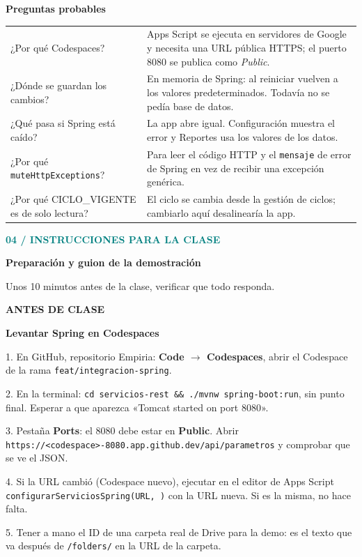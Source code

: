 \documentclass[11pt,a4paper]{article}
\newcommand{\titulo}[3]{\textcolor{teal}{\small\textbf{#1}}\par{\LARGE\bfseries #2}\par\vspace{2mm}#3\par\vspace{3mm}}
\newcommand{\paso}[4]{\begin{tcolorbox}[colback=#1!5!white,colframe=#1!40!white,boxrule=0.5pt,arc=2mm,left=3mm,right=3mm,top=2mm,bottom=2mm,before upper=\raggedright]\textcolor{#1}{\textbf{#2}}\par\textbf{#3}\par #4\end{tcolorbox}}
\newcommand{\cod}[1]{\texttt{#1}}
\begin{document}
\textbf{Preguntas probables}\par
\begin{tabularx}{\textwidth}{>{\raggedright\arraybackslash}p{58mm} >{\raggedright\arraybackslash}X}
\hline
¿Por qué Codespaces? & Apps Script se ejecuta en servidores de Google y necesita una URL pública HTTPS; el puerto 8080 se publica como \emph{Public}. \\
¿Dónde se guardan los cambios? & En memoria de Spring: al reiniciar vuelven a los valores predeterminados. Todavía no se pedía base de datos. \\
¿Qué pasa si Spring está caído? & La app abre igual. Configuración muestra el error y Reportes usa los valores de los datos. \\
¿Por qué \cod{muteHttpExceptions}? & Para leer el código HTTP y el \cod{mensaje} de error de Spring en vez de recibir una excepción genérica. \\
¿Por qué CICLO\_VIGENTE es de solo lectura? & El ciclo se cambia desde la gestión de ciclos; cambiarlo aquí desalinearía la app. \\ \hline
\end{tabularx}
\newpage

\titulo{04 / INSTRUCCIONES PARA LA CLASE}{Preparación y guion de la demostración}{Unos 10 minutos antes de la clase, verificar que todo responda.}

\paso{amber}{ANTES DE CLASE}{Levantar Spring en Codespaces}{
1. En GitHub, repositorio Empiria: \textbf{Code $\rightarrow$ Codespaces}, abrir el Codespace de la rama \cod{feat/integracion-spring}.\par
2. En la terminal: \cod{cd servicios-rest \&\& ./mvnw spring-boot:run}, sin punto final. Esperar a que aparezca «Tomcat started on port 8080».\par
3. Pestaña \textbf{Ports}: el 8080 debe estar en \textbf{Public}. Abrir \cod{https://<codespace>-8080.app.github.dev/api/parametros} y comprobar que se ve el JSON.\par
4. Si la URL cambió (Codespace nuevo), ejecutar en el editor de Apps Script \cod{configurarServiciosSpring(\textquotesingle URL\textquotesingle, \textquotesingle\textquotesingle)} con la URL nueva. Si es la misma, no hace falta.\par
5. Tener a mano el ID de una carpeta real de Drive para la demo: es el texto que va después de \cod{/folders/} en la URL de la carpeta.}
\end{document}
